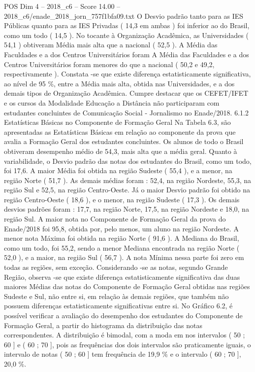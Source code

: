 \begin{textsample}{POS Dim 4 – 2018\_c6 – Score 14.00 – 2018\_c6/enade\_2018\_jorn\_757f1bfa09.txt}
O Desvio padrão tanto para as IES Públicas quanto para as IES Privadas ( 14,3 em ambas ) foi inferior ao do Brasil, como um todo ( 14,5 ).
No tocante à Organização Acadêmica, as Universidades ( 54,1 ) obtiveram Média mais alta que a nacional ( 52,5 ).
A Média das Faculdades e a dos Centros Universitários foram A Média das Faculdades e a dos Centros Universitários foram menores do que a nacional ( 50,2 e 49,2, respectivamente ).
Constata -se que existe diferença estatisticamente significativa, ao nível de 95 \%, entre a Média mais alta, obtida nas Universidades, e a dos demais tipos de Organização Acadêmica.
Cumpre destacar que os CEFET/IFET e os cursos da Modalidade Educação a Distância não participaram com estudantes concluintes de Comunicação Social - Jornalismo no Enade/2018. 6.1.2 Estatísticas Básicas no Componente de Formação Geral Na Tabela 6.3, são apresentadas as Estatísticas Básicas em relação ao componente da prova que avalia a Formação Geral dos estudantes concluintes.
Os alunos de todo o Brasil obtiveram desempenho médio de 54,3, mais alta que a média geral.
Quanto à variabilidade, o Desvio padrão das notas dos estudantes do Brasil, como um todo, foi 17,6.
A maior Média foi obtida na região Sudeste ( 55,4 ), e a menor, na região Norte ( 51,7 ).
As demais médias foram : 52,4, na região Nordeste, 55,3, na região Sul e 52,5, na região Centro-Oeste.
Já o maior Desvio padrão foi obtido na região Centro-Oeste ( 18,6 ), e o menor, na região Sudeste ( 17,3 ).
Os demais desvios padrões foram : 17,7, na região Norte, 17,5, na região Nordeste e 18,0, na região Sul.
A maior nota no Componente de Formação Geral da prova do Enade/2018 foi 95,8, obtida por, pelo menos, um aluno na região Nordeste.
A menor nota Máxima foi obtida na região Norte ( 91,6 ).
A Mediana do Brasil, como um todo, foi 55,2, sendo a menor Mediana encontrada na região Norte ( 52,0 ), e a maior, na região Sul ( 56,7 ).
A nota Mínima nessa parte foi zero em todas as regiões, sem exceção.
Considerando -se as notas, segundo Grande Região, observa -se que existe diferença estatisticamente significativa das duas maiores Médias das notas do Componente de Formação Geral obtidas nas regiões Sudeste e Sul, não entre si, em relação às demais regiões, que também não possuem diferenças estatisticamente significativas entre si.
No Gráfico 6.2, é possível verificar a avaliação do desempenho dos estudantes do Componente de Formação Geral, a partir do histograma da distribuição das notas correspondentes.
A distribuição é bimodal, com a moda em nos intervalos ( 50 ; 60 ] e ( 60 ; 70 ], pois as frequências dos dois intervalos são praticamente iguais, o intervalo de notas ( 50 ; 60 ] tem frequência de 19,9 \% e o intervalo ( 60 ; 70 ], 20,0 \%.

\end{textsample}
